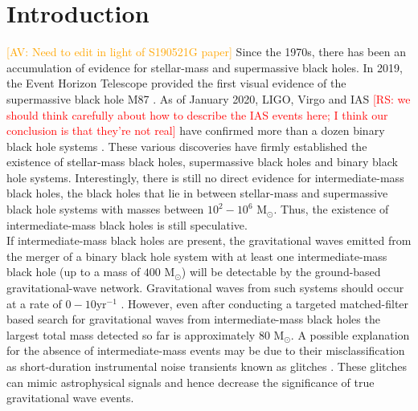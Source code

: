 \documentclass[%
preprint,
 amsmath,amssymb,
 aps,
]{revtex4}
\newcommand{\msun}{{\sc M${}_\odot$}\xspace}
\newcommand{\av}[1]{\textcolor{orange}{[AV: #1]}}
\newcommand{\rs}[1]{\textcolor{red}{[RS: #1]}}
\begin{document}
\section{\label{sec:Introduction}Introduction}
\av{Need to edit in light of S190521G paper}
Since the 1970s, there has been an accumulation of evidence for stellar-mass and supermassive black holes. In 2019, the Event Horizon Telescope provided the first visual evidence of the supermassive black hole M87  \cite{m87photo}.  As of January 2020, LIGO, Virgo and IAS \rs{we should think carefully about how to describe the IAS events here; I think our conclusion is that they're not real} have confirmed more than a dozen binary black hole systems \cite{GWTC1, IAS0, IAS1, IAS2, pycbc_ogc_2}. These various discoveries have firmly established the existence of stellar-mass black holes, supermassive black holes and binary black hole systems.  Interestingly, there is still no direct evidence for intermediate-mass black holes, the black holes that lie in between stellar-mass and supermassive black hole systems with masses between $10^2-10^6$ \msun. Thus, the existence of intermediate-mass black holes is still speculative. \\

If intermediate-mass black holes are present, the gravitational waves emitted from the merger of a binary black hole system with at least one intermediate-mass black hole (up to a mass of $400$ \msun) will be detectable by the ground-based gravitational-wave network. Gravitational waves from such systems should occur at a rate of $0-10\text{yr}^{-1}$ \cite{fregeau2006imbhbRatePrediction, mandel2008rates,rodriguez2015bbhRatePredictions}.  However, even after conducting a targeted matched-filter based search for gravitational waves from intermediate-mass black holes the largest total mass detected so far is approximately $80$ \msun \cite{imbhbSearch2014, ligo_imbh_search, abbott2019gwtc}. A possible explanation for the absence of intermediate-mass events may be due to their misclassification as short-duration instrumental noise transients known as glitches \cite{glitch_in_fifth_ligo_run, bayeswave, improving_dq_in_early_runs, ligo_glitch_gw150914, pycbc_short_duration_transients, pe_with_glitch, blip_glitches}. These glitches can mimic astrophysical signals and hence decrease the significance of true gravitational wave events. \\
\end{document}
